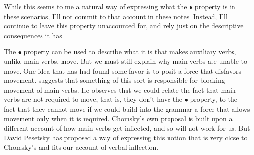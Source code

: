 While this seems to me a natural way of expressing what the $\bullet$ property is in these scenarios, I'll not commit to that account in these notes. Instead, I'll continue to leave this property unaccounted for, and rely just on the descriptive consequences it has.

The $\bullet$ property can be used to describe what it is that makes auxiliary verbs, unlike main verbs, move. But we must still explain why main verbs are unable to move. One idea that has had found some favor is to posit a force that disfavors movement.%
%
%
%
\citet{Chomsky:1995} suggests that something of this sort is responsible for blocking movement of main verbs. He observes that we could relate the fact that main verbs are not required to move, that is, they don't have the $\bullet$ property, to the fact that they cannot move if we could build into the grammar a force that allows movement only when it is required.%
%
%
%
Chomsky's own proposal is built upon a different account of how main verbs get inflected, and so will not work for us. But David Pesetsky\cite{Pesetsky:1989} has proposed a way of expressing this notion that is very close to Chomsky's and fits our account of verbal inflection.

